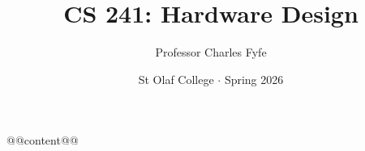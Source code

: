 \documentclass{article}
\title{CS 241: Hardware Design}
\author{Professor Charles Fyfe}
\date{St Olaf College $\cdot$ Spring 2026}
\begin{document}
\maketitle

@@content@@
\end{document}
